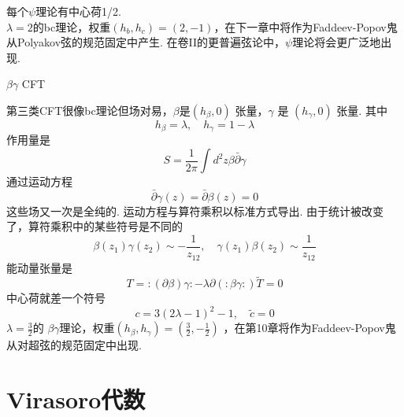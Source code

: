 每个$\psi$理论有中心荷1/2. \\
$\lambda=2$的bc理论，权重$\left(h_{b}, h_{c}\right)=(2,-1)$，在下一章中将作为Faddeev-Popov鬼从Polyakov弦的规范固定中产生. 在卷II的更普遍弦论中，$\psi$理论将会更广泛地出现. \\
\centerline{\Large $\beta\gamma$ CFT}
第三类CFT很像bc理论但场对易，$\beta$是$\left(h_{\beta}, 0\right)$ 张量，$\gamma$ 是 $\left(h_{\gamma}, 0\right)$ 张量.
其中
\begin{equation}
h_{\beta}=\lambda, \quad h_{\gamma}=1-\lambda
\end{equation}
作用量是
\begin{equation}
S=\frac{1}{2 \pi} \int d^{2} z \beta \bar{\partial} \gamma
\end{equation}
通过运动方程
\begin{equation}
\bar{\partial} \gamma(z)=\bar{\partial} \beta(z)=0
\end{equation}
这些场又一次是全纯的. 运动方程与算符乘积以标准方式导出. 由于统计被改变了，算符乘积中的某些符号是不同的
\begin{equation}
\beta\left(z_{1}\right) \gamma\left(z_{2}\right) \sim-\frac{1}{z_{12}}, \quad \gamma\left(z_{1}\right) \beta\left(z_{2}\right) \sim \frac{1}{z_{12}}
\end{equation}
能动量张量是
\begin{subequations}
\begin{equation}
T=:(\partial \beta) \gamma:-\lambda \partial(: \beta \gamma:)
\end{equation}
\begin{equation}
\tilde{T}=0
\end{equation}
\end{subequations}
中心荷就差一个符号
\begin{equation}
c=3(2 \lambda-1)^{2}-1, \quad \tilde{c}=0
\end{equation}
$\lambda=\frac{3}{2}$的 $\beta\gamma$理论，权重$\left(h_{\beta}, h_{\gamma}\right)=\left(\frac{3}{2},-\frac{1}{2}\right)$  ，在第10章将作为Faddeev-Popov鬼从对超弦的规范固定中出现.

\section{Virasoro代数}%

